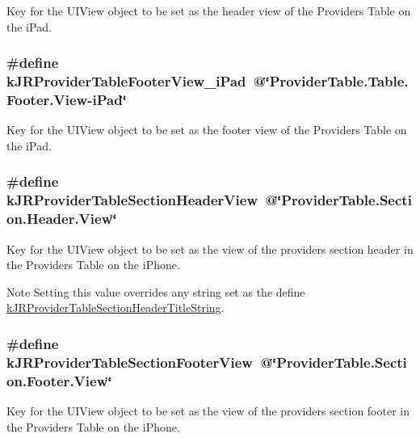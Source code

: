 \label{group__custom_interface_gafaf90a1aa537b105ebc2409ceacc652f}
Key for the {\ttfamily UIView} object to be set as the header view of the Providers Table on the iPad. \hypertarget{group__custom_interface_gaa23a63165d46433e2ec24ba44ef771da}{
\subsubsection[{kJRProviderTableFooterView\_\-iPad}]{\setlength{\rightskip}{0pt plus 5cm}\#define kJRProviderTableFooterView\_\-iPad~@\char`\"{}ProviderTable.Table.Footer.View-\/iPad\char`\"{}}}
\label{group__custom_interface_gaa23a63165d46433e2ec24ba44ef771da}
Key for the {\ttfamily UIView} object to be set as the footer view of the Providers Table on the iPad. \hypertarget{group__custom_interface_gaaff8ebdd2b9badb1d0a019a71d47db46}{
\subsubsection[{kJRProviderTableSectionHeaderView}]{\setlength{\rightskip}{0pt plus 5cm}\#define kJRProviderTableSectionHeaderView~@\char`\"{}ProviderTable.Section.Header.View\char`\"{}}}
\label{group__custom_interface_gaaff8ebdd2b9badb1d0a019a71d47db46}
Key for the {\ttfamily UIView} object to be set as the view of the providers section header in the Providers Table on the iPhone.

\begin{DoxyNote}{Note}
Setting this value overrides any string set as the define \hyperlink{group__custom_interface_ga667a6c955993ec24292875f319a7d763}{kJRProviderTableSectionHeaderTitleString}. 
\end{DoxyNote}
\hypertarget{group__custom_interface_ga984c096e9258dea402a1c27ae8bb6c8f}{
\subsubsection[{kJRProviderTableSectionFooterView}]{\setlength{\rightskip}{0pt plus 5cm}\#define kJRProviderTableSectionFooterView~@\char`\"{}ProviderTable.Section.Footer.View\char`\"{}}}
\label{group__custom_interface_ga984c096e9258dea402a1c27ae8bb6c8f}
Key for the {\ttfamily UIView} object to be set as the view of the providers section footer in the Providers Table on the iPhone.

